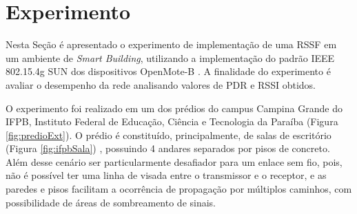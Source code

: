 \chapter{Experimento}
\label{experimento}

Nesta Seção é apresentado o experimento de implementação de uma RSSF em um ambiente de \emph{Smart Building}, utilizando a implementação do padrão IEEE 802.15.4g SUN dos dispositivos OpenMote-B \cite{tuset2020dataset}. A finalidade do experimento é avaliar o desempenho da rede analisando valores de PDR e RSSI obtidos.

O experimento foi realizado em um dos prédios do campus Campina Grande do IFPB, Instituto Federal de Educação, Ciência e Tecnologia da Paraíba (Figura \ref{fig:predioExt}). O prédio é constituído, principalmente, de salas de escritório (Figura \ref{fig:ifpbSala}) , possuindo 4 andares separados por pisos de concreto. Além desse cenário ser particularmente desafiador para um enlace sem fio, pois, não é possível ter uma linha de visada entre o transmissor e o receptor, e as paredes e pisos facilitam a ocorrência de propagação por múltiplos caminhos, com possibilidade de áreas de sombreamento de sinais.


